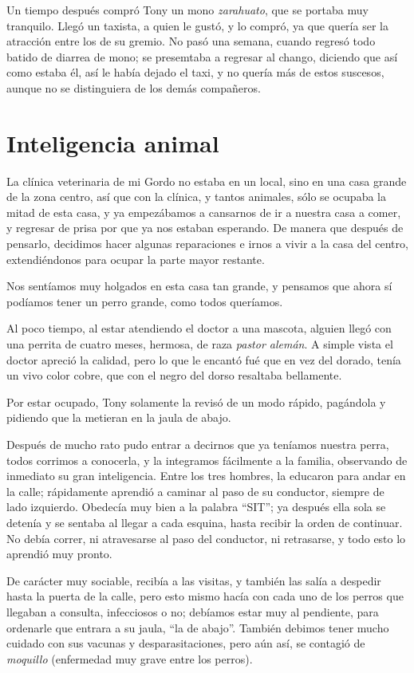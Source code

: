 \documentclass[letterpaper, 12pt]{book}
\begin{document}
Un tiempo después compró Tony un mono \textit{zarahuato}, que se portaba muy tranquilo. Llegó un taxista, a quien le gustó, y lo compró, ya que quería ser la atracción entre los de su gremio. No pasó una semana, cuando regresó todo batido de diarrea de mono; se presemtaba a  regresar al chango, diciendo que así como estaba él, así le había dejado el taxi, y no quería más de estos suscesos, aunque no se distinguiera de los demás compañeros.
\chapter{Inteligencia animal}
La clínica veterinaria de mi Gordo no estaba en un local, sino en una casa grande de la zona centro, así que con la clínica, y tantos animales, sólo se ocupaba la mitad de esta casa, y ya empezábamos a cansarnos de ir a nuestra casa a comer, y regresar de prisa por que ya nos estaban esperando.
De manera que después de pensarlo, decidimos hacer algunas reparaciones e irnos a vivir a la casa del centro, extendiéndonos para ocupar la parte mayor restante.

Nos sentíamos muy holgados en esta casa tan grande, y pensamos  que ahora sí podíamos tener un perro grande, como todos queríamos.

Al poco tiempo, al estar atendiendo el doctor a una mascota, alguien llegó con una perrita de cuatro meses, hermosa, de raza \textit{pastor alemán}. A simple vista el doctor apreció la calidad, pero lo que le encantó fué que en vez del dorado, tenía un vivo color cobre, que con el negro del dorso resaltaba bellamente.

Por estar ocupado, Tony solamente la revisó de un modo rápido, pagándola y pidiendo que la metieran en la jaula de abajo.

Después de mucho rato pudo entrar a decirnos que ya teníamos nuestra perra, todos corrimos a conocerla, y la integramos fácilmente a la familia, observando de inmediato su gran inteligencia. Entre los tres hombres, la educaron para andar en la calle; rápidamente aprendió a caminar al paso de su conductor, siempre de lado izquierdo. Obedecía muy bien a la palabra ``SIT''; ya después ella sola se detenía y se sentaba al llegar a cada esquina, hasta recibir la orden de continuar. No debía correr, ni atravesarse al paso del conductor, ni retrasarse, y todo esto lo aprendió muy pronto. 

De carácter muy sociable, recibía a las visitas, y también las salía a despedir hasta la puerta de la calle, pero esto mismo hacía con cada uno de los perros que llegaban a consulta, infecciosos o no; debíamos estar muy al pendiente, para ordenarle que entrara a su jaula, ``la de abajo''. También debimos tener mucho cuidado con sus vacunas y desparasitaciones, pero aún así, se contagió de \textit{moquillo} (enfermedad muy grave entre los perros).
\end{document}
